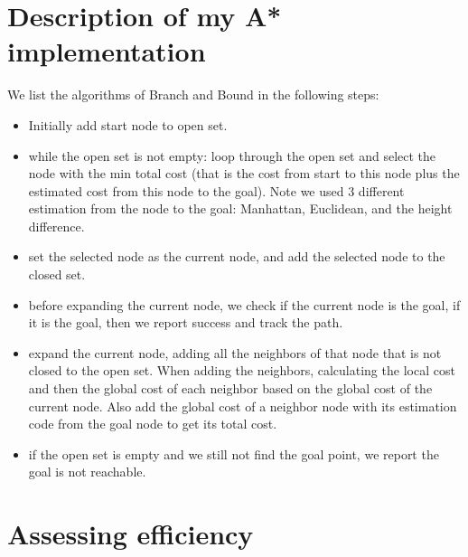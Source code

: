 \documentclass[11pt,oneside]{article}
\begin{document}
\section{Description of my A* implementation}
We list the algorithms of Branch and Bound in the following steps:
\begin{itemize}
    \item Initially add start node to open set.
    \item while the open set is not empty: loop through the open set and select the node with the min total cost (that is the cost from start to this node plus the estimated cost from this node to the goal). Note we used 3 different estimation from the node to the goal: Manhattan, Euclidean, and the height difference. 
    \item set the selected node as the current node, and add the selected node to the closed set. 
    \item before expanding the current node, we check if the current node is the goal, if it is the goal, then we report success and track the path.
    \item expand the current node, adding all the neighbors of that node that is not closed to the open set. When adding the neighbors, calculating the local cost and then the global cost of each neighbor based on the global cost of the current node. Also add the global cost of a neighbor node with its estimation code from the goal node to get its total cost. 
    \item if the open set is empty and we still not find the goal point, we report the goal is not reachable.
\end{itemize}



\section{Assessing efficiency}
\end{document}
